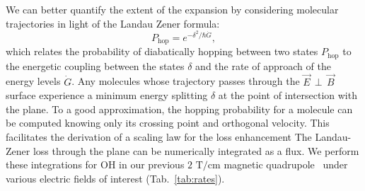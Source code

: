 \documentclass[%
 reprint,
 amsmath,amssymb,
 aps,
prl,
]{revtex4-1}
\newcommand{\epb}{{$\vec{E}\,{\perp}\,\vec{B}$}}
\begin{document}
We can better quantify the extent of the expansion by considering molecular trajectories in light of the Landau Zener formula:
\begin{equation}
P_\text{hop}=e^{-\delta^2/\hbar\dot{G}},
\end{equation}
which relates the probability of diabatically hopping between two states $P_\text{hop}$ to the energetic coupling between the states $\delta$ and the rate of approach of the energy levels $\dot{G}$. 
Any molecules whose trajectory passes through the \epb{} surface experience a minimum energy splitting $\delta$ at the point of intersection with the plane.
To a good approximation, the hopping probability for a molecule can be computed knowing only its crossing point and orthogonal velocity. 
This facilitates the derivation of a scaling law for the loss enhancement
The Landau-Zener loss through the plane can be numerically integrated as a flux.
We perform these integrations for OH in our previous $2\text{ T/cm}$ magnetic quadrupole~\cite{Sawyer2008} under various electric fields of interest (Tab.~\ref{tab:rates}).
\end{document}
